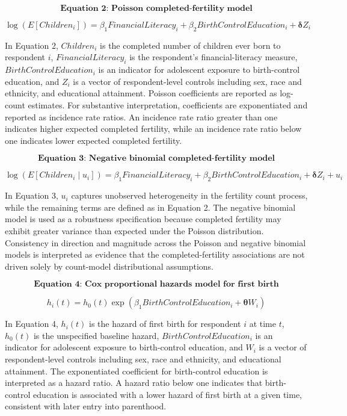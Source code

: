 \documentclass[12pt]{article}
\begin{document}
\[
\textbf{Equation 2: Poisson completed-fertility model}
\]

\begin{equation}
\log\left(E[Children_i]\right) =
\beta_{1}FinancialLiteracy_i + \beta_{2}BirthControlEducation_i + \boldsymbol{\delta}Z_i
\end{equation}

In Equation 2, \(Children_i\) is the completed number of children ever born to respondent \(i\), \(FinancialLiteracy_i\) is the respondent's financial-literacy measure, \(BirthControlEducation_i\) is an indicator for adolescent exposure to birth-control education, and \(Z_i\) is a vector of respondent-level controls including sex, race and ethnicity, and educational attainment. Poisson coefficients are reported as log-count estimates. For substantive interpretation, coefficients are exponentiated and reported as incidence rate ratios. An incidence rate ratio greater than one indicates higher expected completed fertility, while an incidence rate ratio below one indicates lower expected completed fertility.

\[
\textbf{Equation 3: Negative binomial completed-fertility model}
\]

\begin{equation}
\log\left(E[Children_i \mid u_i]\right) =
\beta_{1}FinancialLiteracy_i + \beta_{2}BirthControlEducation_i + \boldsymbol{\delta}Z_i + u_i
\end{equation}

In Equation 3, \(u_i\) captures unobserved heterogeneity in the fertility count process, while the remaining terms are defined as in Equation 2. The negative binomial model is used as a robustness specification because completed fertility may exhibit greater variance than expected under the Poisson distribution. Consistency in direction and magnitude across the Poisson and negative binomial models is interpreted as evidence that the completed-fertility associations are not driven solely by count-model distributional assumptions.

\[
\textbf{Equation 4: Cox proportional hazards model for first birth}
\]

\begin{equation}
h_i(t) = h_0(t)\exp(\beta_{1}BirthControlEducation_i + \boldsymbol{\theta}W_i)
\end{equation}

In Equation 4, \(h_i(t)\) is the hazard of first birth for respondent \(i\) at time \(t\), \(h_0(t)\) is the unspecified baseline hazard, \(BirthControlEducation_i\) is an indicator for adolescent exposure to birth-control education, and \(W_i\) is a vector of respondent-level controls including sex, race and ethnicity, and educational attainment. The exponentiated coefficient for birth-control education is interpreted as a hazard ratio. A hazard ratio below one indicates that birth-control education is associated with a lower hazard of first birth at a given time, consistent with later entry into parenthood.
\end{document}

